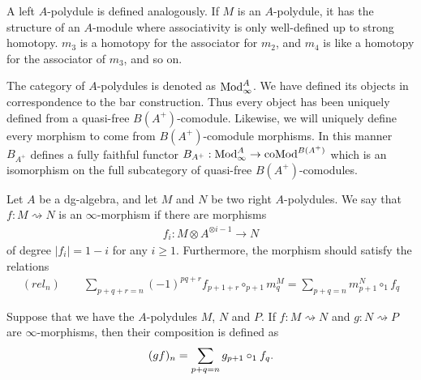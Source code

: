 \documentclass[../thesis.tex]{subfiles}
\begin{document}
            A left $A$-polydule is defined analogously. If $M$ is an $A$-polydule, it has the structure of an $A$-module where associativity is only well-defined up to strong homotopy. $m_3$ is a homotopy for the associator for $m_2$, and $m_4$ is like a homotopy for the associator of $m_3$, and so on.

            The category of $A$-polydules is denoted as $\tt{Mod}_\infty^A$. We have defined its objects in correspondence to the bar construction. Thus every object has been uniquely defined from a quasi-free $B(A^+)$-comodule. Likewise, we will uniquely define every morphism to come from $B(A^+)$-comodule morphisms. In this manner $B_{A^+}$ defines a fully faithful functor $B_{A^+} : \tt{Mod}_\infty^A \rightarrow \tt{coMod}^{B(A^+)}$ which is an isomorphism on the full subcategory of quasi-free $B(A^+)$-comodules.
            
            \begin{definition}
                Let $A$ be a dg-algebra, and let $M$ and $N$ be two right $A$-polydules. We say that $f : M \rightsquigarrow N$ is an $\infty$-morphism if there are morphisms
                \begin{align*}
                    f_i : M \otimes A^{\otimes i - 1} \rightarrow N
                \end{align*}
                of degree $|f_i| = 1 - i$ for any $i \geq 1$. Furthermore, the morphism should satisfy the relations
                \begin{align*}
                    (rel_n)\qquad \sum_{p+q+r = n} (-1)^{pq+r}f_{p+1+r} \circ_{p+1} m^M_{q} = \sum_{p+q = n} m^N_{p+1} \circ_1 f_q
                \end{align*}
            \end{definition}
            
            Suppose that we have the $A$-polydules $M$, $N$ and $P$. If $f : M \rightsquigarrow N$ and $g : N \rightsquigarrow P$ are $\infty$-morphisms, then their composition is defined as
            \begin{align*}
                (gf)_n = \sum_{p+q=n}g_{p+1}\circ_1 f_q\tt{.}
            \end{align*}
\end{document}

